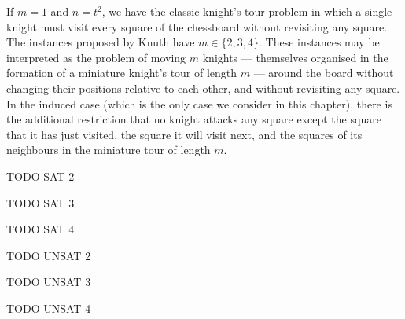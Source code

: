 If $m=1$ and $n=t^2$, we have the classic knight's tour problem in which a single knight
must visit every square of the chessboard without revisiting any square.  The instances proposed
by Knuth have $m \in \{2,3,4\}$.  These instances may be interpreted as the problem of moving $m$
knights --- themselves organised in the formation of a miniature knight's tour of length $m$ ---
around the board without changing their positions relative to each other, and without revisiting
any square.  In the induced case (which is the only case we consider in this chapter), there
is the additional restriction that no knight attacks any square except the square that it has
just visited, the square it will visit next, and the squares of its neighbours in the miniature
tour of length $m$.

\begin{table}[htb]
\centering
\footnotesize
    
\caption{TODO SAT 2}
\label{tab:TODO}
\end{table}

\begin{table}[htb]
\centering
\footnotesize
    
\caption{TODO SAT 3}
\label{tab:TODO}
\end{table}

\begin{table}[htb]
\centering
\footnotesize
    
\caption{TODO SAT 4}
\label{tab:TODO}
\end{table}

\begin{table}[htb]
\centering
\footnotesize
    
\caption{TODO UNSAT 2}
\label{tab:TODO}
\end{table}

\begin{table}[htb]
\centering
\footnotesize
    
\caption{TODO UNSAT 3}
\label{tab:TODO}
\end{table}

\begin{table}[htb]
\centering
\footnotesize
    
\caption{TODO UNSAT 4}
\label{tab:TODO}
\end{table}

